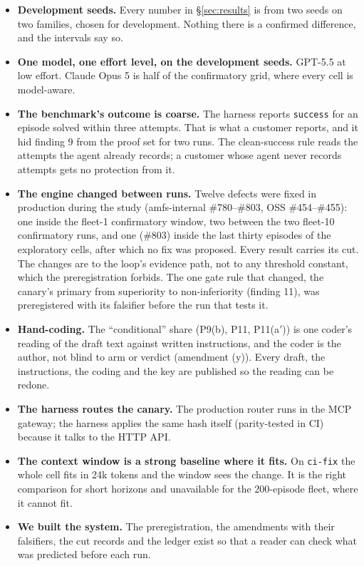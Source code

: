 \documentclass[11pt]{article}
\newcommand{\code}[1]{\texttt{#1}}
\begin{document}
\begin{itemize}[leftmargin=1.4em, itemsep=0.25em]
\item \textbf{Development seeds.} Every number in \S\ref{sec:results} is from two seeds on two
families, chosen for development. Nothing there is a confirmed difference, and the intervals say
so.
\item \textbf{One model, one effort level, on the development seeds.} GPT-5.5 at low effort.
Claude Opus 5 is half of the confirmatory grid, where every cell is model-aware.
\item \textbf{The benchmark's outcome is coarse.} The harness reports \code{success} for an
episode solved within three attempts. That is what a customer reports, and it hid finding 9 from
the proof set for two runs. The clean-success rule reads the attempts the agent already records;
a customer whose agent never records attempts gets no protection from it.
\item \textbf{The engine changed between runs.} Twelve defects were fixed in production during
the study (amfs-internal \#780--\#803, OSS \#454--\#455): one inside the fleet-1 confirmatory
window, two between the two fleet-10 confirmatory runs, and one (\#803) inside the last thirty
episodes of the exploratory cells, after which no fix was proposed. Every result carries its
cut. The changes are to the loop's evidence path, not to any threshold constant, which the
preregistration forbids. The one gate rule that changed, the canary's primary from superiority
to non-inferiority (finding 11), was preregistered with its falsifier before the run that tests
it.
\item \textbf{Hand-coding.} The ``conditional'' share (P9(b), P11, P11(a$'$)) is one coder's
reading of the draft text against written instructions, and the coder is the author, not blind
to arm or verdict (amendment (y)). Every draft, the instructions, the coding and the key are
published so the reading can be redone.
\item \textbf{The harness routes the canary.} The production router runs in the MCP gateway; the
harness applies the same hash itself (parity-tested in CI) because it talks to the HTTP API.
\item \textbf{The context window is a strong baseline where it fits.} On \code{ci-fix} the whole
cell fits in 24k tokens and the window sees the change. It is the right comparison for short
horizons and unavailable for the 200-episode fleet, where it cannot fit.
\item \textbf{We built the system.} The preregistration, the amendments with their falsifiers,
the cut records and the ledger exist so that a reader can check what was predicted before each
run.
\end{itemize}
\end{document}
